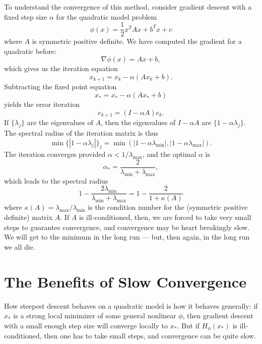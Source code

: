 \documentclass[12pt, leqno]{article} %
\begin{document}
To understand the convergence of this method, consider gradient
descent with a fixed step size $\alpha$ for the quadratic model problem
\[
  \phi(x) = \frac{1}{2} x^T A x + b^T x + c
\]
where $A$ is symmetric positive definite.  
We have computed the gradient for a quadratic before:
\[
  \nabla \phi(x) = Ax + b,
\]
which gives us the iteration equation
\[
  x_{k+1} = x_k - \alpha (A x_k + b).
\]
Subtracting the fixed point equation
\[
  x_* = x_* - \alpha (A x_* + b)
\]
yields the error iteration
\[
  e_{k+1} = (I-\alpha A) e_k.
\]
If $\{ \lambda_j \}$ are the eigenvalues of $A$, then the
eigenvalues of $I-\alpha A$ are $\{ 1-\alpha \lambda_j \}$.
The spectral radius of the iteration matrix is thus
\[
  \min \{ |1-\alpha \lambda_j| \}_j =
  \min \left( |1-\alpha \lambda_{\min}|, |1-\alpha \lambda_{\max}| \right).
\]
The iteration converges provided $\alpha < 1/\lambda_{\max}$, and the
optimal $\alpha$ is
\[
  \alpha_* = \frac{2}{\lambda_{\min} + \lambda_{\max}},
\]
which leads to the spectral radius
\[
  1 - \frac{2 \lambda_{\min}}{\lambda_{\min} + \lambda_{\max}} =
  1 - \frac{2}{1 + \kappa(A)}
\]
where $\kappa(A) = \lambda_{\max}/\lambda_{\min}$ is the condition
number for the (symmetric positive definite) matrix $A$.  If $A$
is ill-conditioned, then, we are forced to take very small steps
to guarantee convergence, and convergence may be
heart breakingly slow.  We will get to the minimum in the long run
--- but, then again, in the long run we all die.

\section{The Benefits of Slow Convergence}

How steepest descent behaves on a quadratic model
is how it behaves generally: if $x_*$ is a
strong local minimizer of some general nonlinear $\phi$, then gradient
descent with a small enough step size will converge locally to
$x_*$.  But if $H_{\phi}(x_*)$ is ill-conditioned, then one has to
take small steps, and convergence can be quite slow.
\end{document}
